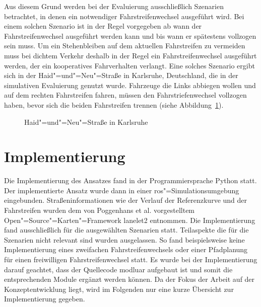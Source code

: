 Aus diesem Grund werden bei der Evaluierung ausschlie{\ss}lich Szenarien betrachtet, in denen ein notwendiger Fahrstreifenwechsel ausgef\"uhrt wird.
Bei einem solchen Szenario ist in der Regel vorgegeben ab wann der Fahrstreifenwechsel ausgef\"uhrt werden kann und bis wann er sp\"atestens vollzogen sein muss.
Um ein Stehenbleiben auf dem aktuellen Fahrstreifen zu vermeiden muss bei dichtem Verkehr deshalb in der Regel ein Fahrstreifenwechsel ausgef\"uhrt werden, der ein kooperatives Fahrverhalten verlangt.
Eine solches Szenario ergibt sich in der Haid"=und"=Neu"=Stra{\ss}e in Karlsruhe, Deutschland, die in der simulativen Evaluierung genutzt wurde.
Fahrzeuge die Links abbiegen wollen und auf dem rechten Fahrstreifen fahren, m\"ussen den Fahrstriefenwechsel vollzogen haben, bevor sich die beiden Fahrstreifen trennen (siehe Abbildung~\ref{fig:Szene}).

\begin{figure}[!htbp]
    \centering
    \caption[Haid-und-Neu"=stra{\ss}e]{Haid"=und"=Neu"=Stra{\ss}e in Karlsruhe}
    \label{fig:Szene}
\end{figure}


\section{Implementierung}
Die Implementierung des Ansatzes fand in der Programmiersprache Python statt.
Der implementierte Ansatz wurde dann in einer \gls{ros}"=Simulationsumgebung eingebunden.
Stra{\ss}eninformationen wie der Verlauf der Referenzkurve und der Fahrstreifen wurden dem von Poggenhans et al. \cite{Poggenhans2018} vorgestelltem Open"=Source"=Karten"=Framework lanelet2 entnommen.
Die Implementierung fand ausschlie{\ss}lich f\"ur die ausgew\"ahlten Szenarien statt.
Teilaspekte die f\"ur die Szenarien nicht relevant sind wurden ausgelassen.
So fand beispielsweise keine Implementierung eines zweifachen Fahrstreifenwechsels oder einer Pfadplanung f\"ur einen freiwilligen Fahrstreifenwechsel statt.
Es wurde bei der Implementierung darauf geachtet, dass der Quellecode modluar aufgebaut ist und somit die entsprechenden Module erg\"anzt werden k\"onnen.
Da der Fokus der Arbeit auf der Konzeptentwicklung liegt, wird im Folgenden nur eine kurze \"Ubersicht zur Implementierung gegeben.


